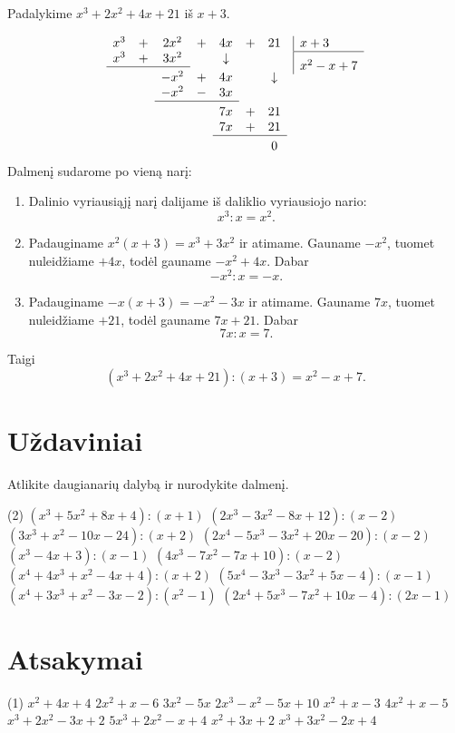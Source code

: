 \documentclass[11pt,a4paper]{scrartcl}
\begin{document}
\begin{example}
Padalykime $x^3+2x^2+4x+21$ iš $x+3$.

\setlength{\arraycolsep}{2pt}
\renewcommand{\arraystretch}{1.1}
\[
\begin{array}[t]{ccccccc}
	x^3 & + & 2x^2 & + & 4x & + & 21 \\
	x^3 & + & 3x^2 &      & \downarrow &   &    \\
	\cline{1-3}
	\noalign{\vskip 3pt}
	    &   & -x^2 & + & 4x &   & \downarrow \\
	    &   & -x^2 & - & 3x &   &             \\
	\cline{3-5}
	\noalign{\vskip 3pt}
	    &   &      &   & 7x & + & 21 \\
	    &   &      &   & 7x & + & 21 \\
	\cline{5-7}
	\noalign{\vskip 3pt}
	    &   &      &   &    &   & 0
\end{array}
\enskip
\begin{array}[t]{|@{\enskip}l}
	x+3 \\
	\hline
	\rule{0pt}{14pt}x^2-x+7
\end{array}
\]
Dalmenį sudarome po vieną narį:
\begin{enumerate}
	\item Dalinio vyriausiąjį narį dalijame iš daliklio vyriausiojo nario:
	\[
	x^3:x=x^2.
	\]
	\item Padauginame $x^2(x+3)=x^3+3x^2$ ir atimame. Gauname $-x^2$, tuomet nuleidžiame $+4x$, todėl gauname $-x^2+4x$. Dabar
	\[
	-x^2:x=-x.
	\]
	\item Padauginame $-x(x+3)=-x^2-3x$ ir atimame. Gauname $7x$, tuomet nuleidžiame $+21$, todėl gauname $7x+21$. Dabar
	\[
	7x:x=7.
	\]
\end{enumerate}
Taigi
\[
(x^3+2x^2+4x+21):(x+3)=x^2-x+7.
\]
\end{example}

\section{Uždaviniai}

\begin{problem}
Atlikite daugianarių dalybą ir nurodykite dalmenį.
\begin{tasks}[label={\arabic*.},label-offset=0.9em](2)
	\task $(x^3+5x^2+8x+4):(x+1)$
	\task $(2x^3-3x^2-8x+12):(x-2)$
	\task $(3x^3+x^2-10x-24):(x+2)$
	\task $(2x^4-5x^3-3x^2+20x-20):(x-2)$
	\task $(x^3-4x+3):(x-1)$
	\task $(4x^3-7x^2-7x+10):(x-2)$
	\task $(x^4+4x^3+x^2-4x+4):(x+2)$
	\task $(5x^4-3x^3-3x^2+5x-4):(x-1)$
	\task $(x^4+3x^3+x^2-3x-2):(x^2-1)$
	\task $(2x^4+5x^3-7x^2+10x-4):(2x-1)$
\end{tasks}
\end{problem}

\newpage
\section{Atsakymai}

\begin{tasks}[label={\arabic*.},label-offset=0.9em](1)
	\task $x^2+4x+4$
	\task $2x^2+x-6$
	\task $3x^2-5x$
	\task $2x^3-x^2-5x+10$
	\task $x^2+x-3$
	\task $4x^2+x-5$
	\task $x^3+2x^2-3x+2$
	\task $5x^3+2x^2-x+4$
	\task $x^2+3x+2$
	\task $x^3+3x^2-2x+4$
\end{tasks}
\end{document}
